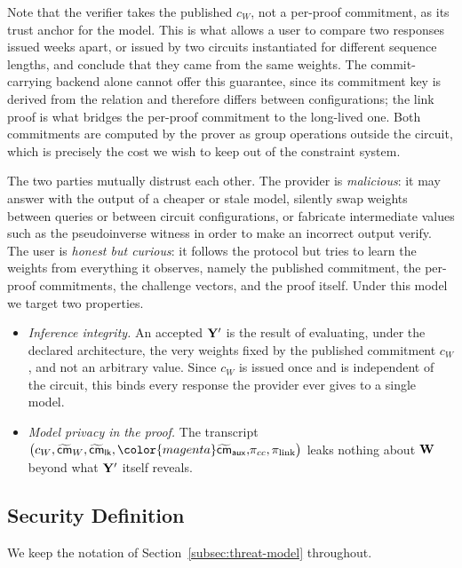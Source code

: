 \documentclass[sigconf,anonymous,review,balance=false]{acmart}
\newcommand{\rev}[1]{{\color{magenta}#1}}
\begin{document}
Note that the verifier takes the published $c_{W}$, not a per-proof commitment, as its trust anchor for the model. This is what allows a user to compare two responses issued weeks apart, or issued by two circuits instantiated for different sequence lengths, and conclude that they came from the same weights. The commit-carrying backend alone cannot offer this guarantee, since its commitment key is derived from the relation and therefore differs between configurations; the link proof is what bridges the per-proof commitment to the long-lived one. Both commitments are computed by the prover as group operations outside the circuit, which is precisely the cost we wish to keep out of the constraint system.

 The two parties mutually distrust each other. The provider is \emph{malicious}: it may answer with the output of a cheaper or stale model, silently swap weights between queries or between circuit configurations, or fabricate intermediate values such as the pseudoinverse witness in order to make an incorrect output verify. The user is \emph{honest but curious}: it follows the protocol but tries to learn the weights from everything it observes, namely the published commitment, the per-proof commitments, the challenge vectors, and the proof itself. Under this model we target two properties.

\begin{itemize} [leftmargin=3mm, itemsep=2pt, topsep=2pt]
    \item \emph{Inference integrity.} An accepted ${\mathbf{Y}}'$ is the result of evaluating, under the declared architecture, the very weights fixed by the published commitment $c_{W}$, and not an arbitrary value. Since $c_{W}$ is issued once and is independent of the circuit, this binds every response the provider ever gives to a single model.
    \item \emph{Model privacy in the proof.} The transcript $\bigl(c_{W}, \widetilde{\mathsf{cm}}_{W}, \widetilde{\mathsf{cm}}_{\mathsf{lk}}, \rev{\widetilde{\mathsf{cm}}_{\mathsf{aux}},} \pi_{cc}, \pi_{\mathrm{link}}\bigr)$ leaks nothing about \rev{${\mathbf{W}}$} beyond what ${\mathbf{Y}}'$ itself reveals.
\end{itemize}

\subsection{Security Definition}
\label{subsec:sec-def}

\rev{We keep the notation of Section~\ref{subsec:threat-model} throughout.}
\end{document}
